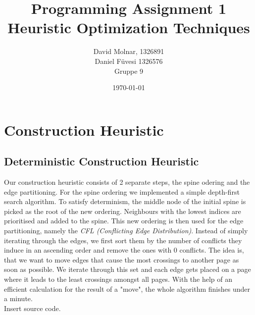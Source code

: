 \documentclass[11pt]{article}
\title{Programming Assignment 1\\ \vspace{10px} \large Heuristic Optimization Techniques}
\author{David Molnar, 1326891\\ Daniel Füvesi 1326576\\Gruppe 9}
\date{\today}
\begin{document}
\lstset{language=Java}
\maketitle
 
\section{Construction Heuristic}
\subsection{Deterministic Construction Heuristic}

\hspace{0.5cm} Our construction heuristic consists of 2 separate steps, the spine odering and the edge partitioning. For the spine ordering we implemented a simple depth-first search algorithm. To satisfy determinism, the middle node of the initial spine is picked as the root of the new ordering. Neighbours with the lowest indices are prioritised and added to the spine. This new ordering is then used for the edge partitioning, namely the \textit{CFL (Conflicting Edge Distribution)}. Instead of simply iterating through the edges, we first sort them by the number of conflicts they induce in an ascending order and remove the ones with 0 conflicts. The idea is, that we want to move edges that cause the most crossings to another page as soon as possible. We iterate through this set and each edge gets placed on a page where it leads to the least crossings amongst all pages. With the help of an efficient calculation for the result of a "move", the whole algorithm finishes under a minute.\\
\newline
Insert source code.\\
\newline

%
\end{document}
